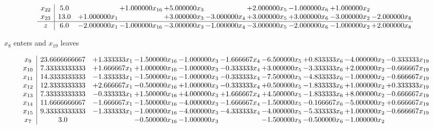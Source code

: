 \documentclass[10pt]{article}
\begin{document}
\[\begin{array}{c| c c@{\hskip 2pt} c@{\hskip 2pt} c@{\hskip 2pt} c@{\hskip 2pt} c@{\hskip 2pt} c@{\hskip 2pt} c@{\hskip 2pt} c@{\hskip 2pt} }
 x_{22}   &  5.0  &   & + 1.000000 x_{16} & + 5.000000 x_{3} &   & + 2.000000 x_{5} & -1.000000 x_{6} & + 1.000000 x_{2} &   \\
 x_{23}   &  13.0 & + 1.000000 x_{1} &   & + 3.000000 x_{3} & -3.000000 x_{4} & + 3.000000 x_{5} & + 3.000000 x_{6} & -3.000000 x_{2} & -2.000000 x_{8}\\
\hline
z    &  6.0 & -2.000000 x_{1} & -1.000000 x_{16} & -3.000000 x_{3} & -1.000000 x_{4} & -3.000000 x_{5} & -2.000000 x_{6} & -1.000000 x_{2} & + 2.000000 x_{8}\\
\end{array}\]


 $ x_{8} $ enters and $ x_{19} $ leaves 

 \[\begin{array}{c| c c@{\hskip 2pt} c@{\hskip 2pt} c@{\hskip 2pt} c@{\hskip 2pt} c@{\hskip 2pt} c@{\hskip 2pt} c@{\hskip 2pt} c@{\hskip 2pt} }
 x_{9}   &  23.6666666667 & + 1.333333 x_{1} & -1.500000 x_{16} & -1.000000 x_{3} & -1.666667 x_{4} & -6.500000 x_{5} & + 0.833333 x_{6} & -4.000000 x_{2} & -0.333333 x_{19}\\
 x_{10}   &  7.33333333333 & + 1.666667 x_{1} & + 1.000000 x_{16} & -1.000000 x_{3} & -0.333333 x_{4} & + 3.000000 x_{5} & -3.333333 x_{6} & + 2.000000 x_{2} & -0.666667 x_{19}\\
 x_{11}   &  14.3333333333 & -1.333333 x_{1} & -1.500000 x_{16} & -1.000000 x_{3} & -0.333333 x_{4} & -7.500000 x_{5} & -4.833333 x_{6} & -1.000000 x_{2} & -0.666667 x_{19}\\
 x_{12}   &  12.3333333333 & + 2.666667 x_{1} & -0.500000 x_{16} & + 1.000000 x_{3} & -0.333333 x_{4} & + 0.500000 x_{5} & -1.833333 x_{6} & + 1.000000 x_{2} & + 0.333333 x_{19}\\
 x_{13}   &  7.33333333333 & -0.333333 x_{1} & + 1.500000 x_{16} & + 4.000000 x_{3} & + 1.666667 x_{4} & + 4.500000 x_{5} & -1.833333 x_{6} & + 8.000000 x_{2} & -0.666667 x_{19}\\
 x_{14}   &  11.6666666667 & -1.666667 x_{1} & -1.500000 x_{16} & -4.000000 x_{3} & -1.666667 x_{4} & -1.500000 x_{5} & -0.166667 x_{6} & -5.000000 x_{2} & + 0.666667 x_{19}\\
 x_{15}   &  9.33333333333 & -1.333333 x_{1} & -1.000000 x_{16} & -4.000000 x_{3} & -4.333333 x_{4} & -4.000000 x_{5} & -5.333333 x_{6} & + 1.000000 x_{2} & -0.666667 x_{19}\\
 x_{7}   &  3.0  &   & -0.500000 x_{16} & -1.000000 x_{3} &   & -1.500000 x_{5} & -0.500000 x_{6} & -1.000000 x_{2} &   \\

\end{array}\]
\end{document}
